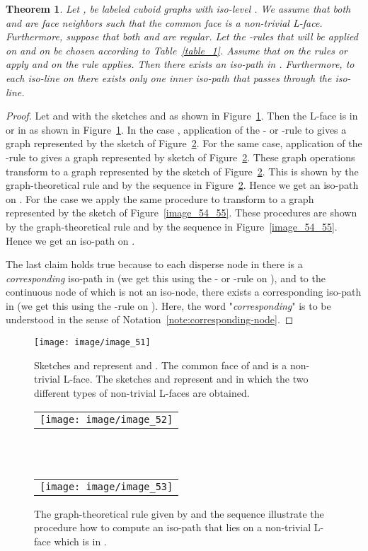 \documentclass[a4paper,11pt]{article}
\newtheorem{theorem}{Theorem}[section]
\begin{document}
\begin{theorem}\label{thm:class-4}
Let ,  be labeled cuboid graphs with iso-level
. We assume that both  and  are face neighbors such that the common face
 is a non-trivial L-face. Furthermore, suppose that both  and  are
regular. Let the -rules that will be applied on  and on  be chosen according to
Table~\ref{table_1}. Assume that on  the rules  or  apply and on  the rule 
applies. Then there exists an iso-path in . Furthermore, to each iso-line on  there exists only one
inner iso-path that passes through the iso-line.
\end{theorem}
\begin{proof} Let  and  with
the sketches  and  as shown in Figure~\ref{image_51}. Then the L-face  is
in  or in  as shown in Figure~\ref{image_51}. In the case
, application of the - or -rule to  gives a graph represented
by the sketch  of Figure~\ref{image_52_53}. For the same case, application of the -rule
to  gives a graph represented by sketch  of Figure~\ref{image_52_53}. These graph
operations transform  to a graph represented by the sketch  of Figure~\ref{image_52_53}.
This is shown by the graph-theoretical rule  and by the sequence  in Figure~\ref{image_52_53}.
Hence we get an iso-path on . For the case  we apply the same procedure to
transform  to a graph represented by the sketch  of Figure~\ref{image_54_55}. These procedures
are shown by the graph-theoretical rule  and by the sequence  in Figure~\ref{image_54_55}.
Hence we get an iso-path on .

The last claim holds true because to each disperse node in  there is a {\it corresponding} iso-path
in  (we get this using the - or -rule on ), and to the continuous node of  which
is not an iso-node, there exists a corresponding iso-path in  (we get this using the -rule
on ). Here, the word "{\it corresponding}" is to be understood in the sense of
Notation~\ref{note:corresponding-node}.
\end{proof}
\begin{figure}[!ht]
\texttt{[image: image/image\_51]}
\caption{Sketches  and  represent  and .
The common face of  and  is a non-trivial
L-face. The sketches  and  represent  and  in which the two
different types of non-trivial L-faces are obtained.}
\label{image_51}
\end{figure}
\FloatBarrier
\begin{figure}[!ht]

\begin{tabular}[c]{l}
\texttt{[image: image/image\_52]}
\end{tabular}\\ \\

\begin{tabular}[c]{l}
\texttt{[image: image/image\_53]}
\end{tabular}
\caption{The graph-theoretical rule given by  and the sequence  illustrate the procedure
how to compute an iso-path that lies on a non-trivial L-face which is in .}
\label{image_52_53}
\end{figure}
\FloatBarrier
\end{document}
